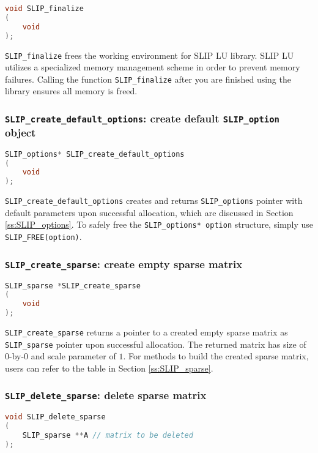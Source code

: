 \documentclass[11pt]{article}
\theoremstyle{definition}
\begin{document}
\begin{lstlisting}[language=C,frame=single]
void SLIP_finalize
(
    void
);
\end{lstlisting}

\verb|SLIP_finalize| frees the working environment for SLIP LU library. SLIP LU utilizes a specialized memory management scheme in order to prevent memory failures. Calling the function \verb|SLIP_finalize| after you are finished using the library ensures all memory is freed.

\cprotect\subsubsection{\verb|SLIP_create_default_options|: create default \verb|SLIP_option| object}\label{ss:create_default_options}
\begin{lstlisting}[language=C,frame=single]
SLIP_options* SLIP_create_default_options
(
    void
);
\end{lstlisting}

\verb|SLIP_create_default_options| creates and returns \verb|SLIP_options| pointer with default parameters upon successful allocation, which are discussed in Section \ref{ss:SLIP_options}.
To safely free the \verb|SLIP_options* option| structure, simply use \verb|SLIP_FREE(option)|.


\cprotect\subsubsection{\verb|SLIP_create_sparse|: create empty sparse matrix}\label{ss:create_sparse}

\begin{lstlisting}[language=C,frame=single]
SLIP_sparse *SLIP_create_sparse
(
    void
);
\end{lstlisting}

\verb|SLIP_create_sparse| returns a pointer to a created empty sparse matrix as \verb|SLIP_sparse| pointer upon successful allocation. The returned matrix has size of $0$-by-$0$ and scale parameter of $1$. For methods to build the created sparse matrix, users can refer to the table in Section \ref{ss:SLIP_sparse}.

\cprotect\subsubsection{\verb|SLIP_delete_sparse|: delete sparse matrix}\label{ss:delete_sparse}
\begin{lstlisting}[language=C,frame=single]
void SLIP_delete_sparse
(
    SLIP_sparse **A // matrix to be deleted
);
\end{lstlisting}
\end{document}
